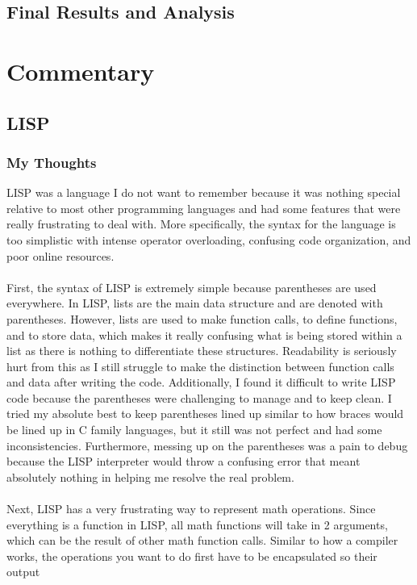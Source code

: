 \documentclass[letterpaper, 10pt, DIV=13]{scrartcl}
\numberwithin{equation}{section}
\numberwithin{figure}{section}
\numberwithin{table}{section}
\begin{document}
\subsection{Final Results and Analysis}

\section{Commentary}
\subsection{LISP}
\subsubsection{My Thoughts}
LISP was a language I do not want to remember because it was nothing special relative to most other programming languages and had some features 
that were really frustrating to deal with. More specifically, the syntax for the language is too simplistic with intense operator overloading, 
confusing code organization, and poor online resources.
\\ \\
First, the syntax of LISP is extremely simple because parentheses are used everywhere. In LISP, lists are the main data structure and are denoted with 
parentheses. However, lists are used to make function calls, to define functions, and to store data, which makes it really confusing what is being stored within a 
list as there is nothing to differentiate these structures. Readability is seriously hurt from this as I still struggle to make the distinction between function 
calls and data after writing the code. Additionally, I found it difficult to write LISP code because the parentheses were challenging to manage and to keep clean. 
I tried my absolute best to keep parentheses lined up similar to how braces would be lined up in C family languages, but it still was not perfect and had some 
inconsistencies. Furthermore, messing up on the parentheses was a pain to debug because the LISP interpreter would throw a confusing error that meant absolutely 
nothing in helping me resolve the real problem.
\\ \\
Next, LISP has a very frustrating way to represent math operations. Since everything is a function in LISP, all math functions will take in 2 arguments, which 
can be the result of other math function calls. Similar to how a compiler works, the operations you want to do first have to be encapsulated so their output 
\end{document}
